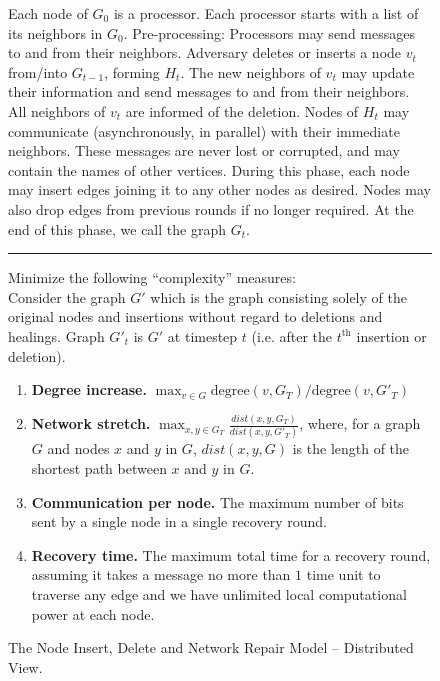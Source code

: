 \documentclass[11pt, letter]{article}
\newcommand{\degree}{\mathrm{degree}}
\begin{document}
\begin{figure}[h!]
\caption{The Node Insert, Delete and Network Repair Model -- Distributed View.}
\label{algo:model-2}
\begin{boxedminipage}{\textwidth}
\begin{algorithmic}
\STATE Each node of $G_0$ is a processor.  
\STATE Each processor starts with a list of its neighbors in $G_0$.
\STATE Pre-processing: Processors may send messages to and from
their neighbors.
\STATE Adversary deletes or inserts a node $v_t$ from/into $G_{t-1}$, forming $H_t$.
\STATE The new neighbors of $v_t$ may update their information and send messages to and from
their neighbors.
\ENDIF
{} 
\STATE All neighbors of $v_t$ are informed of the deletion.
\STATE Nodes of $H_t$ may communicate (asynchronously, in parallel) 
with their immediate neighbors.  These messages are never lost or
corrupted, and may contain the names of other vertices.
\STATE During this phase, each node may insert edges
joining it to any other nodes as desired. 
Nodes may also drop edges from previous rounds if no longer required.
\ENDIF
\STATE At the end of this phase, we call the graph $G_t$.
\ENDFOR
\vspace{10pt}
\hrule
\STATE
{} Minimize the following ``complexity'' measures:\\
Consider the graph  $G'$ which is the graph consisting solely of the original nodes and insertions without regard to
deletions and healings. Graph $G'_{t}$ is $G'$ at timestep $t$ (i.e. after the $t^{\mathrm{th}}$ insertion or deletion).
\begin{enumerate}
\item{\bf Degree increase.}  $\max_{v \in G} \degree(v,G_T) / \degree(v,G'_T)$
\item {\bf Network stretch.} $\max_{x, y \in G_{T}} \frac{dist(x,y,G_{T})}{dist(x,y,G'_{T})}$, where, for a graph $G$ and nodes $x$ and $y$ in $G$, $dist(x,y,G)$ is the
length of the shortest path between $x$ and $y$ in $G$.
\item{\bf Communication per node.} The maximum number of bits sent by a single node in a single recovery round.
\item{\bf Recovery time.} The maximum total time for a recovery round,
assuming it takes a message no more than $1$ time unit to traverse any edge and we have unlimited local computational power at each node.
\end{enumerate}
\end{algorithmic}
\end{boxedminipage}
\end{figure}
\end{document}
